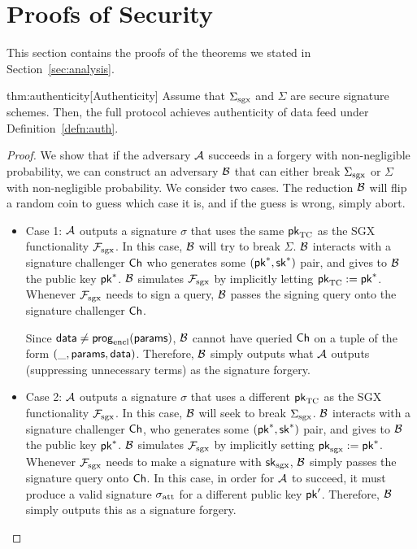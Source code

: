 
\section{Proofs of Security}
\label{sec:analysis-proofs}

This section contains the proofs of the theorems we stated in Section~\ref{sec:analysis}.


\begin{retheorem}{thm:authenticity}[Authenticity]
Assume that ${\Sigma_{\textrm{sgx}}}$ and $\Sigma$ are secure signature schemes.
Then, the full \tc protocol achieves authenticity of data feed under Definition~\ref{defn:auth}.
\end{retheorem}

\begin{proof}
We show that if the 
adversary $\mathcal{A}$ succeeds in a forgery with non-negligible probability,
we can construct an adversary $\mathcal{B}$ that can either
break ${\Sigma_{\textrm{sgx}}}$ or $\Sigma$ with non-negligible probability.
We consider two cases. 
The reduction $\mathcal{B}$ will flip a random coin to guess which
case it is, and if the guess is wrong, simply abort.
\begin{itemize}[leftmargin=5mm]
\item
Case 1: $\mathcal{A}$ outputs a signature $\sigma$ that uses the same  
${\sf pk}_{\textrm{TC}}$ as the SGX functionality $\mathcal{F}_{\textrm{sgx}}$.
In this case, $\mathcal{B}$ will try to break $\Sigma$. 
$\mathcal{B}$ interacts with a signature challenger ${\sf Ch}$ who generates
some $({\sf pk}^*, {\sf sk}^*)$ pair, and gives to $\mathcal{B}$ the public key
${\sf pk}^*$. $\mathcal{B}$ simulates 
$\mathcal{F}_{\textrm{sgx}}$ by implicitly letting ${\sf pk}_{\textrm{TC}} := {\sf pk}^*$.
Whenever $\mathcal{F}_{\textrm{sgx}}$ needs to sign a query, $\mathcal{B}$ passes the signing query
onto the signature challenger ${\sf Ch}$.

Since ${\sf data} \neq {\sf prog}_{\textrm{encl}}({\sf params})$,
$\mathcal{B}$ cannot have queried ${\sf Ch}$  
on a tuple of the form $(\_, {\sf params}, {\sf data})$. 
Therefore, $\mathcal{B}$ simply outputs 
what $\mathcal{A}$ 
outputs (suppressing unnecessary terms) as the signature forgery. 

\item
Case 2:
 $\mathcal{A}$ outputs a signature $\sigma$ that uses a different 
${\sf pk}_{\textrm{TC}}$ as the SGX functionality $\mathcal{F}_{\textrm{sgx}}$.
In this case, $\mathcal{B}$ will seek to break ${\Sigma_{\textrm{sgx}}}$.
$\mathcal{B}$ interacts with a signature challenger ${\sf Ch}$, who generates
some $({\sf pk}^*, {\sf sk}^*)$ pair, and gives to $\mathcal{B}$ the public key
${\sf pk}^*$. $\mathcal{B}$ simulates $\mathcal{F}_{\textrm{sgx}}$ by implicitly setting
${\sf pk}_{\mathrm{sgx}} := {\sf pk}^*$.
Whenever $\mathcal{F}_{\textrm{sgx}}$ needs to make a signature
with ${\sf sk}_{\mathrm{sgx}}$, 
$\mathcal{B}$ simply passes the signature query onto ${\sf Ch}$.
In this case, in order for $\mathcal{A}$ to succeed,
it must produce a valid signature ${\sigma_{\textrm{att}}}$ 
for a different public key ${\sf pk}'$.
Therefore, $\mathcal{B}$ simply outputs this as a signature forgery.
\end{itemize}
\end{proof}


